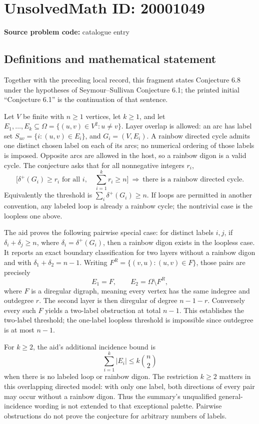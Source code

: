\documentclass[11pt]{article}
\begin{document}
\section*{UnsolvedMath ID: 20001049}
\textbf{Source problem code:} catalogue entry
\subsection{Definitions and mathematical statement}
Together with the preceding local record, this fragment states Conjecture 6.8 under the hypotheses of Seymour--Sullivan Conjecture 6.1; the printed initial ``Conjecture 6.1'' is the continuation of that sentence.

Let $V$ be finite with $n\geq1$ vertices, let $k\geq1$, and let $E_1,\ldots,E_k\subseteq\Omega=\{(u,v)\in V^2:u\ne v\}$. Layer overlap is allowed: an arc has label set $S_{uv}=\{i:(u,v)\in E_i\}$, and $G_i=(V,E_i)$. A rainbow directed cycle admits one distinct chosen label on each of its arcs; no numerical ordering of those labels is imposed. Opposite arcs are allowed in the host, so a rainbow digon is a valid cycle. The conjecture asks that for all nonnegative integers $r_i$,
\[
 \bigl[\delta^+(G_i)\geq r_i\text{ for all }i,\quad
 \textstyle\sum_{i=1}^k r_i\geq n\bigr]
 \ \Longrightarrow\ \text{there is a rainbow directed cycle}.
\]
Equivalently the threshold is $\sum_i\delta^+(G_i)\geq n$. If loops are permitted in another convention, any labeled loop is already a rainbow cycle; the nontrivial case is the loopless one above.

The aid proves the following pairwise special case: for distinct labels $i,j$, if $\delta_i+\delta_j\geq n$, where $\delta_i=\delta^+(G_i)$, then a rainbow digon exists in the loopless case. It reports an exact boundary classification for two layers without a rainbow digon and with $\delta_1+\delta_2=n-1$. Writing $F^R=\{(v,u):(u,v)\in F\}$, those pairs are precisely
\[
 E_1=F,\qquad E_2=\Omega\setminus F^R,
\]
where $F$ is a diregular digraph, meaning every vertex has the same indegree and outdegree $r$. The second layer is then diregular of degree $n-1-r$. Conversely every such $F$ yields a two-label obstruction at total $n-1$. This establishes the two-label threshold; the one-label loopless threshold is impossible since outdegree is at most $n-1$.

For $k\geq2$, the aid's additional incidence bound is
\[
 \sum_{i=1}^k|E_i|\leq k\binom n2
\]
when there is no labeled loop or rainbow digon. The restriction $k\geq2$ matters in this overlapping directed model: with only one label, both directions of every pair may occur without a rainbow digon. Thus the summary's unqualified general-incidence wording is not extended to that exceptional palette. Pairwise obstructions do not prove the conjecture for arbitrary numbers of labels.
\end{document}
